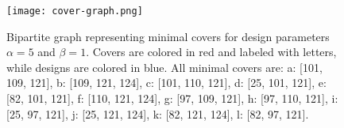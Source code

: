 \begin{figure}[H]
    \caption[Bipartite graph of minimal covers]{Bipartite graph representing minimal covers for design parameters $\alpha=5$ and $\beta=1$. Covers are colored in red and labeled with letters, while designs are colored in blue.
        All minimal covers are:
            a: [101, 109, 121],
            b: [109, 121, 124],
            c: [101, 110, 121],
            d: [25, 101, 121],
            e: [82, 101, 121],
            f: [110, 121, 124],
            g: [97, 109, 121],
            h: [97, 110, 121],
            i: [25, 97, 121],
            j: [25, 121, 124],
            k: [82, 121, 124],
            l: [82, 97, 121].
            }
    \centering
    \texttt{[image: cover-graph.png]}
    \label{fig7:cover-graph}
\end{figure}

